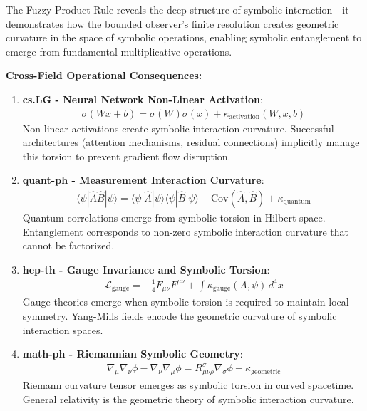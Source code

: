 \begin{scholium}
\label{scholium:bk4_symbolic_entanglement}
The Fuzzy Product Rule reveals the deep structure of symbolic interaction—it demonstrates how the bounded observer's finite resolution creates geometric curvature in the space of symbolic operations, enabling symbolic entanglement to emerge from fundamental multiplicative operations.

\textbf{Cross-Field Operational Consequences:}

\begin{enumerate}
\item \textbf{cs.LG - Neural Network Non-Linear Activation}: 
   \begin{align}
   \sigma(Wx + b) = \sigma(W)\sigma(x) + \kappa_{\text{activation}}(W, x, b)
   \end{align}
   Non-linear activations create symbolic interaction curvature. Successful architectures (attention mechanisms, residual connections) implicitly manage this torsion to prevent gradient flow disruption.

\item \textbf{quant-ph - Measurement Interaction Curvature}:
   \begin{align}
   \langle \psi | \hat{A}\hat{B} | \psi \rangle = \langle \psi | \hat{A} | \psi \rangle \langle \psi | \hat{B} | \psi \rangle + \text{Cov}(\hat{A}, \hat{B}) + \kappa_{\text{quantum}}
   \end{align}
   Quantum correlations emerge from symbolic torsion in Hilbert space. Entanglement corresponds to non-zero symbolic interaction curvature that cannot be factorized.

\item \textbf{hep-th - Gauge Invariance and Symbolic Torsion}:
   \begin{align}
   \mathcal{L}_{\text{gauge}} = -\frac{1}{4}F_{\mu\nu}F^{\mu\nu} + \int \kappa_{\text{gauge}}(A, \psi) \, d^4x
   \end{align}
   Gauge theories emerge when symbolic torsion is required to maintain local symmetry. Yang-Mills fields encode the geometric curvature of symbolic interaction spaces.

\item \textbf{math-ph - Riemannian Symbolic Geometry}:
   \begin{align}
   \nabla_\mu \nabla_\nu \phi - \nabla_\nu \nabla_\mu \phi = R_{\mu\nu\rho}^\sigma \nabla_\sigma \phi + \kappa_{\text{geometric}}
   \end{align}
   Riemann curvature tensor emerges as symbolic torsion in curved spacetime. General relativity is the geometric theory of symbolic interaction curvature.


\end{enumerate}
\end{scholium}
